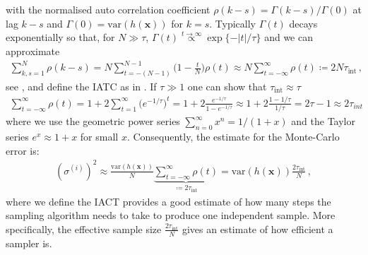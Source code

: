 with the normalised auto correlation coefficient $\rho(k-s) =  \Gamma(k-s)/ \Gamma(0)$ at lag $k-s$ and $\Gamma(0) = \text{var}(h(\bm{x}) )$ for $k=s$.
Typically $\Gamma(t)$ decays exponentially so that, for $N\gg \tau$, $\Gamma(t) \overset{t \rightarrow \infty }{ \propto} \exp\{ - |t| / \tau \}  $ and we can approximate
\begin{align}
	\sum_{k,s=1}^{N}\rho(k-s)  = N \sum_{t = -(N-1) }^{N-1} \Bigg(1- \frac{t}{N} \Bigg) \rho(t)  \approx N  \sum_{t = - \infty }^{\infty} \rho(t) \coloneqq 2 N \tau_{\text{int}}\, ,
\end{align}
see \cite{Sokal1997}, and define the IATC as in \cite[pp. 103-105]{wolff2002LecNot}.
If $\tau \gg 1$ one can show that $\tau_{\text{int}} \approx \tau$
\begin{align}
	\sum_{t = - \infty }^{\infty} \rho(t) =  1 + 2 \sum_{t = 1}^{\infty} \big(e^{-1/ \tau}\big)^t =  1 + 2 \frac{e^{-1/ \tau} }{1 - e^{-1/ \tau}} \approx  1 + 2 \frac{1 -1/ \tau }{1/ \tau} =  2 \tau -1 \approx 2 \tau_{int}
\end{align}
where we use the geometric power series $\sum^{\infty}_{n=0} x^n= 1/ (1+x)$ and the Taylor series $ e^x \approx 1+x$ for small $x$.
Consequently, the estimate for the Monte-Carlo error is:
\begin{align}
	(\sigma^{(i)})^2   \approx  \frac{\text{var}(h(\bm{x}) )}{N} \underbrace{\sum_{t = - \infty }^{\infty} \rho(t)}_{ \coloneqq 	2\tau_{\text{int}} } = \text{var}(h(\bm{x})) \frac{ 2 \tau_{\text{int}} }{N} \, , \label{eq:MCerr}
\end{align}
where we define the IACT provides a good estimate of how many steps the sampling algorithm needs to take to produce one independent sample.
More specifically, the effective sample size $\frac{ 2 \tau_{\text{int}} }{N}$ gives an estimate of how efficient a sampler is.

